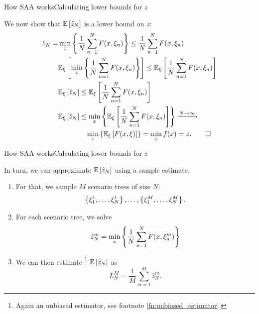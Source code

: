 \begin{frame}{How SAA works}{Calculating lower bounds for $z$}

	We now show that $\mathbb{E}\left[ \hat{z}_N \right]$ is a \alert{lower bound} on $z$:
	\begin{align*}
		\hat{z}_N = &\min_x \left\{ \frac{1}{N}\sum_{n=1}^{N}F(x, \xi_n) \right \} \le \frac{1}{N}\sum_{n=1}^{N}F(x, \xi_n) \\
		 &\mathbb{E}_\xi\left[ \min_x \left\{ \frac{1}{N}\sum_{n=1}^{N}F(x, \xi_n) \right \} \right] \le  \mathbb{E}_\xi\left[ \frac{1}{N}\sum_{n=1}^{N}F(x, \xi_n) \right] \\
		 &\mathbb{E}_\xi\left[ \hat{z}_N \right] \le  \mathbb{E}_\xi\left[ \frac{1}{N}\sum_{n=1}^{N}F(x, \xi_n) \right] \\ 
		 &\mathbb{E}_\xi\left[ \hat{z}_N \right] \le \min_x \left\{ \mathbb{E}_\xi\left[ \frac{1}{N}\sum_{n=1}^{N}F(x, \xi_n) \right] \right \} \xrightarrow{N \rightarrow \infty} \\ 
		 & \quad\quad\quad\quad \min_x \left\{ \mathbb{E}_\xi\left[ F(x,\xi) \right] \right \} = \min_x f(x) = z. \qed
	\end{align*}
	
\end{frame}


\begin{frame}{How SAA works}{Calculating lower bounds for $z$}

	In turn, we can approximate $\mathbb{E}\left[ \hat{z}_N \right]$ using \alert a \alert{sample estimate}.
	
	\begin{enumerate}[<+->]
		\item For that, we sample $M$ scenario trees of size $N$: 	
		$$
			\left\{ \xi_1^1,\dots,\xi_N^1 \right \}, \dots, \left\{ \xi_1^M,\dots,\xi_N^M \right \}.
		$$
		\item For each scenario tree, we solve 
		\begin{equation*} 
			\hat{z}^m_N = \min_x\left\{ \frac{1}{N}\sum_{n=1}^{N}F(x, \xi_n^m) \right \}
		\end{equation*}
		\item We can then estimate%
		\footnote{Again an unbiased estimator, see footnote \ref{fn:unbiased_estimator}.} 
		 $\mathbb{E}\left[ \hat{z}_N \right]$ as
		\begin{equation*}
			L_N^M = \frac{1}{M} \sum_{m=1}^M \hat{z}^m_N.
		\end{equation*}
	\end{enumerate}
	
\end{frame}


